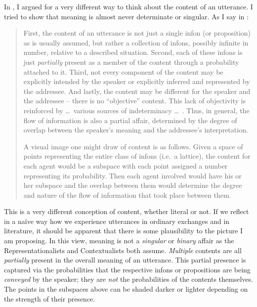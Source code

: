 
In \citet{parikh:rs, parikh:le}, I argued for a very different way to think about the content of an utterance. I tried to show that meaning is almost never determinate or singular. As I say in \citet[217--218]{parikh:le}:

\begin{quote}

First, the content of an utterance is not just a single infon (or proposition) as is usually assumed, but rather a collection of infons, possibly infinite in number, relative to a described situation. Second, each of these infons is just \emph{partially} present as a member of the content through a probability attached to it. Third, not every component of the content may be explicitly intended by the speaker or explicitly inferred and represented by the addressee. And lastly, the content may be different for the speaker and the addressee -- there is no ``objective'' content. This lack of objectivity is reinforced by \ldots\ various sources of indeterminacy \ldots\ . Thus, in general, the flow of information is also a partial affair, determined by the degree of overlap between the speaker's meaning and the addressee's interpretation.

A visual image one might draw of content is as follows. Given a space of points representing the entire class of infons (i.e.\ a lattice), the content for each agent would be a subspace with each point assigned a number representing its probability. Then each agent involved would have his or her subspace and the overlap between them would determine the degree and nature of the flow of information that took place between them.

\end{quote} 

This is a very different conception of content, whether literal or not. If we reflect in a na\"{i}ve way how we experience utterances in ordinary exchanges and in literature, it should be apparent that there is some plausibility to the picture I am proposing. In this view, meaning is not a \emph{singular} or \emph{binary} affair as the Representationalists and Contextualists both assume. \emph{Multiple} contents are all \emph{partially} present in the overall meaning of an utterance. This partial presence is captured via the probabilities that the respective infons or propositions are being \emph{conveyed} by the speaker; they are \emph{not} the probabilities of the contents themselves. The points in the subspaces above can be shaded darker or lighter depending on the strength of their presence.

